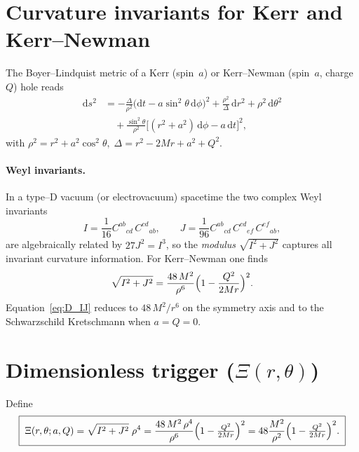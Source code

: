\documentclass[a4paper, 12pt, oneside]{book}
\numberwithin{equation}{chapter}
\begin{document}
\section{Curvature invariants for Kerr and Kerr--Newman}
The Boyer--Lindquist metric of a Kerr (spin~$a$) or Kerr--Newman
(spin~$a$, charge~$Q$) hole reads
\begin{align}
\mathrm d s^{2}&=-\frac{\Delta}{\rho^{2}}\bigl(\mathrm d t-a\sin^{2}\theta\,
\mathrm d\phi\bigr)^{2}
+\frac{\rho^{2}}{\Delta}\,\mathrm d r^{2}
+\rho^{2}\,\mathrm d\theta^{2}
\nonumber\\
&\quad
+\frac{\sin^{2}\theta}{\rho^{2}}
\bigl[(r^{2}+a^{2})\,\mathrm d\phi-a\,\mathrm d t\bigr]^{2},
\label{eq:D_metric}
\end{align}
with
\(\displaystyle
\rho^{2}=r^{2}+a^{2}\cos^{2}\theta,\;
\Delta=r^{2}-2Mr+a^{2}+Q^{2}.
\)

\paragraph{Weyl invariants.}
In a type--D vacuum (or electrovacuum) spacetime
the two complex Weyl invariants
\begin{equation}
I=\frac{1}{16}C^{ab}{}_{cd}\,C^{cd}{}_{ab},
\qquad
J=\frac{1}{96}C^{ab}{}_{cd}\,C^{cd}{}_{ef}\,C^{ef}{}_{ab},
\end{equation}
are algebraically related by \(27J^{2}=I^{3}\), so the \emph{modulus}
\(\sqrt{I^{2}+J^{2}}\) captures all invariant curvature information.
For Kerr–Newman one finds \cite{Stephani2003}
\begin{equation}
\sqrt{I^{2}+J^{2}}
=\frac{48\,M^{2}}{\rho^{6}}
\Bigl(1-\frac{Q^{2}}{2Mr}\Bigr)^{2}.
\label{eq:D_IJ}
\end{equation}
Equation~\eqref{eq:D_IJ} reduces to \(48\,M^{2}/r^{6}\) on the
symmetry axis and to the Schwarzschild Kretschmann when
\(a=Q=0\).

\section{Dimensionless trigger (\texorpdfstring{\boldmath$\Xi(r,\theta)$}{Xi})}

Define
\begin{equation}
\boxed{\;
\Xi(r,\theta;a,Q)
=\sqrt{I^{2}+J^{2}}\;\rho^{4}
=\frac{48\,M^{2}\,\rho^{4}}{\rho^{6}}
\Bigl(1-\tfrac{Q^{2}}{2Mr}\Bigr)^{2}
=48\frac{M^{2}}{\rho^{2}}
\Bigl(1-\tfrac{Q^{2}}{2Mr}\Bigr)^{2}.
\;}
\label{eq:D_Xi_def}
\end{equation}
\end{document}
